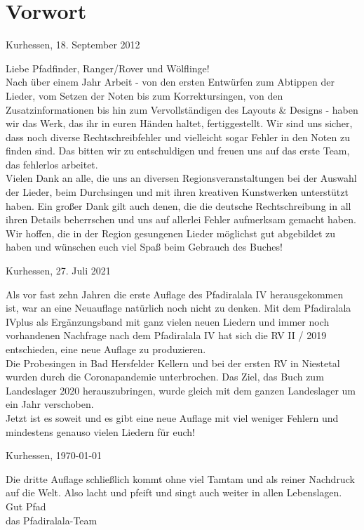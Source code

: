 \section*{Vorwort}

\begin{flushright} 
Kurhessen, 18. September 2012
\end{flushright}

Liebe Pfadfinder, Ranger/Rover und Wölflinge! \\

Nach über einem Jahr Arbeit - von den ersten Entwürfen zum Abtippen der Lieder, vom Setzen der Noten bis zum Korrektursingen, von den Zusatzinformationen bis hin zum Vervollständigen des Layouts \& Designs - haben wir das Werk, das ihr in euren Händen haltet, fertiggestellt. Wir sind uns sicher, dass noch diverse Rechtschreibfehler und vielleicht sogar Fehler in den Noten zu finden sind. Das bitten wir zu entschuldigen und freuen uns auf das erste Team, das fehlerlos arbeitet. \\

Vielen Dank an alle, die uns an diversen Regionsveranstaltungen bei der Auswahl der Lieder, beim Durchsingen und mit ihren kreativen Kunstwerken unterstützt haben. Ein großer Dank gilt auch denen, die die deutsche Rechtschreibung in all ihren Details beherrschen und uns auf allerlei Fehler aufmerksam gemacht haben. \\

Wir hoffen, die in der Region gesungenen Lieder möglichst gut abgebildet zu haben und wünschen euch viel Spaß beim Gebrauch des Buches!

\begin{flushright} 
Kurhessen, 27. Juli 2021
\end{flushright}

Als vor fast zehn Jahren die erste Auflage des Pfadiralala IV herausgekommen ist, war an eine Neuauflage natürlich noch nicht zu denken. Mit dem Pfadiralala IVplus als Ergänzungsband mit ganz vielen neuen Liedern und immer noch vorhandenen Nachfrage nach dem Pfadiralala IV hat sich die RV II / 2019 entschieden, eine neue Auflage zu produzieren. \\

Die Probesingen in Bad Hersfelder Kellern und bei der ersten RV in Niestetal wurden durch die Coronapandemie unterbrochen. Das Ziel, das Buch zum Landeslager 2020 herauszubringen, wurde gleich mit dem ganzen Landeslager um ein Jahr verschoben. \\

Jetzt ist es soweit und es gibt eine neue Auflage mit viel weniger Fehlern und mindestens genauso vielen Liedern für euch! \\

\begin{flushright} 
    Kurhessen, \today
\end{flushright}

Die dritte Auflage schließlich kommt ohne viel Tamtam und als reiner Nachdruck auf die Welt. Also lacht und pfeift und singt auch weiter in allen Lebenslagen.\\

Gut Pfad\\
das Pfadiralala-Team
